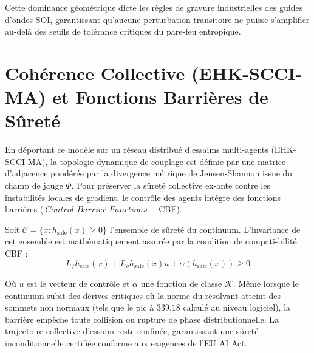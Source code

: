 Cette dominance g{\'e}om{\'e}trique dicte les r{\`e}gles de gravure industrielles des guides d'ondes SOI, garantissant qu'aucune perturbation transitoire ne puisse s'amplifier au-del{\`a} des seuils de tol{\'e}rance critiques du pare-feu entropique.

\section{Coh{\'e}rence Collective (EHK-SCCI-MA) et Fonctions Barri{\`e}res de S{\^u}ret{\'e}}
En d{\'e}portant ce mod{\`e}le sur un r{\'e}seau distribu{\'e} d'essaims multi-agents (EHK-SCCI-MA), la topologie dynamique de couplage est d{\'e}finie par une matrice d'adjacence pond{\'e}r{\'e}e par la divergence m{\'e}trique de Jensen-Shannon issue du champ de jauge \(\Phi\). Pour pr{\'e}server la s{\^u}ret{\'e} collective ex-ante contre les instabilit{\'e}s locales de gradient, le contr{\^o}le des agents int{\`e}gre des fonctions barri{\`e}res (\(\textit{Control Barrier Functions} -\) CBF).

Soit \(\mathcal{C} = \{x : h_{\text{safe}}(x) \geq 0\}\) l'ensemble de s{\^u}ret{\'e} du continuum. L'invariance de cet ensemble est math{\'e}matiquement assur{\'e}e par la condition de compati-bilit{\'e} CBF :
\[L_f h_{\text{safe}}(x) + L_g h_{\text{safe}}(x)u + \alpha(h_{\text{safe}}(x)) \geq 0\]

O{\`u} \(u\) est le vecteur de contr{\^o}le et \(\alpha\) une fonction de classe \(\mathcal{K}\). M{\^e}me lorsque le continuum subit des d{\'e}rives critiques o{\`u} la norme du r{\'e}solvant atteint des sommets non normaux (tels que le pic {\`a} \(339.18\) calcul{\'e} au niveau logiciel), la barri{\`e}re emp{\^e}che toute collision ou rupture de phase distributionnelle. La trajectoire collective d'essaim reste confin{\'e}e, garantissant une s{\^u}ret{\'e} inconditionnelle certifiée conforme aux exigences de l'EU AI Act.
